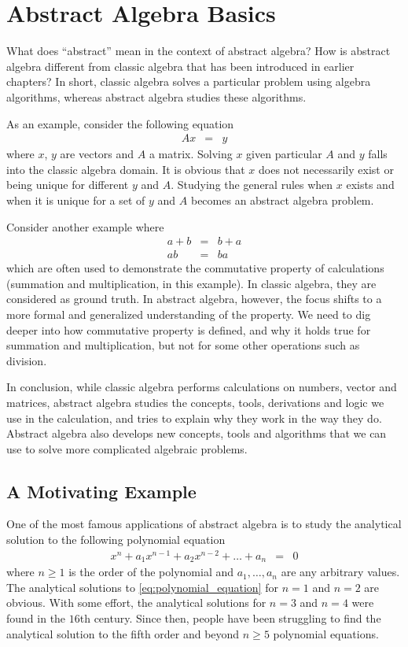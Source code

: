 \chapter{Abstract Algebra Basics}

What does ``abstract'' mean in the context of abstract algebra? How is abstract algebra different from classic algebra that has been introduced in earlier chapters? In short, classic algebra solves a particular problem using algebra algorithms, whereas abstract algebra studies these algorithms.

As an example, consider the following equation
\begin{eqnarray}
  Ax &=& y \nonumber
\end{eqnarray}
where $x$, $y$ are vectors and $A$ a matrix. Solving $x$ given particular $A$ and $y$ falls into the classic algebra domain. It is obvious that $x$ does not necessarily exist or being unique for different $y$ and $A$. Studying the general rules when $x$ exists and when it is unique for a set of $y$ and $A$ becomes an abstract algebra problem.

Consider another example where
\begin{eqnarray}
 a+b &=& b+a \nonumber \\
  ab &=& ba \nonumber
\end{eqnarray}
which are often used to demonstrate the commutative property of calculations (summation and multiplication, in this example). In classic algebra, they are considered as ground truth. In abstract algebra, however, the focus shifts to a more formal and generalized understanding of the property. We need to dig deeper into how commutative property is defined, and why it holds true for summation and multiplication, but not for some other operations such as division.

In conclusion, while classic algebra performs calculations on numbers, vector and matrices, abstract algebra studies the concepts, tools, derivations and logic we use in the calculation, and tries to explain why they work in the way they do. Abstract algebra also develops new concepts, tools and algorithms that we can use to solve more complicated algebraic problems.

\section{A Motivating Example}

One of the most famous applications of abstract algebra is to study the analytical solution to the following polynomial equation
\begin{eqnarray}
  x^n + a_1x^{n-1} + a_2x^{n-2} + \ldots + a_n &=& 0 \label{eq:polynomial_equation}
\end{eqnarray}
where $n\geq 1$ is the order of the polynomial and $a_1, \ldots, a_n$ are any arbitrary values. The analytical solutions to \eqref{eq:polynomial_equation} for $n=1$ and $n=2$ are obvious. With some effort, the analytical solutions for $n=3$ and $n=4$ were found in the $16$th century. Since then, people have been struggling to find the analytical solution to the fifth order and beyond $n\geq5$ polynomial equations.

